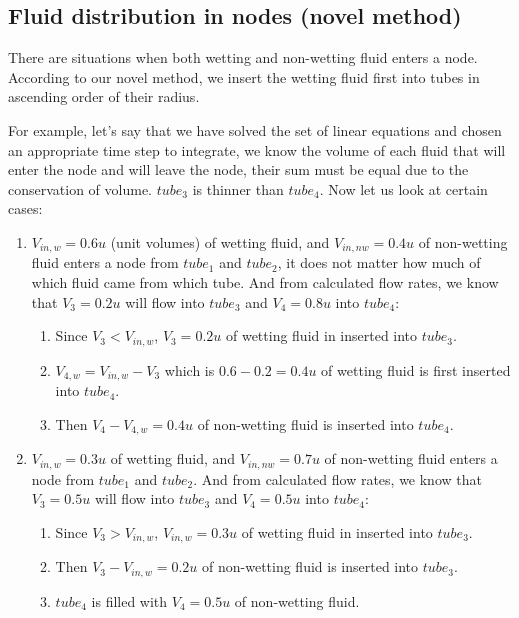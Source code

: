 \documentclass[
	12pt
] {article}
\begin{document}
\subsection{Fluid distribution in nodes (novel method)} \label{sec:fluid-distb-exmpl}
	There are situations when both wetting and non-wetting fluid enters a node. According to our novel method, we insert the wetting fluid first into tubes in ascending order of their radius.
	
	For example, let's say that we have solved the set of linear equations and chosen an appropriate time step to integrate, we know the volume of each fluid that will enter the node and will leave the node, their sum must be equal due to the conservation of volume. ${tube}_3$ is thinner than ${tube}_4$. Now let us look at certain cases:
	\begin{enumerate}
		\item $V_{in, w} = 0.6 u$ (unit volumes) of wetting fluid, and $V_{in, nw} = 0.4 u$ of non-wetting fluid enters a node from ${tube}_1$ and ${tube}_2$, it does not matter how much of which fluid came from which tube. And from calculated flow rates, we know that $V_{3} = 0.2 u$ will flow into ${tube}_3$ and $V_4 = 0.8 u$ into $tube_4$:
		
		\begin{enumerate}
			\item Since $V_3 < V_{in, w}$, $V_3 = 0.2 u$ of wetting fluid in inserted into ${tube}_3$.
			\item $V_{4, w} = V_{in, w} - V_3$ which is $0.6 - 0.2 = 0.4 u$ of wetting fluid is first inserted into ${tube}_4$.
			\item Then $V_4 - V_{4, w} = 0.4 u$ of non-wetting fluid is inserted into ${tube}_4$.
		\end{enumerate}
		
		\item $V_{in, w} = 0.3 u$ of wetting fluid, and $V_{in, nw} = 0.7 u$ of non-wetting fluid enters a node from ${tube}_1$ and ${tube}_2$. And from calculated flow rates, we know that $V_3 = 0.5 u$ will flow into ${tube}_3$ and $V_4 = 0.5 u$ into $tube_4$:
		
		\begin{enumerate}
			\item Since $V_3 > V_{in, w}$, $V_{in, w} = 0.3 u$ of wetting fluid in inserted into ${tube}_3$.
			\item Then $V_3 - V_{in, w} = 0.2 u$ of non-wetting fluid is inserted into ${tube}_3$.
			\item ${tube}_4$ is filled with $V_4 = 0.5 u$ of non-wetting fluid.
		\end{enumerate}
	\end{enumerate}
\end{document}
